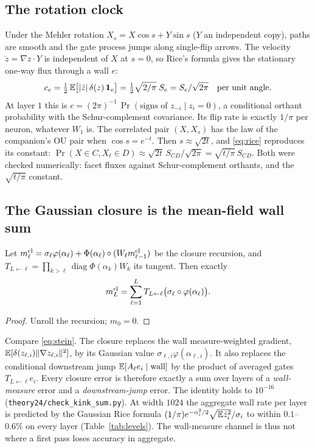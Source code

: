 \subsection{The rotation clock}
Under the Mehler rotation $X_s=X\cos s+Y\sin s$ ($Y$ an independent copy), paths are smooth and the gate process jumps
along single-flip arrows. The velocity $\dot z=\nabla z\cdot Y$ is independent of $X$ at $s=0$, so Rice's formula gives
the stationary one-way flux through a wall $e$:
\begin{equation}\label{eq:rice}
c_e=\tfrac12\,\mathbb{E}\big[|\dot z|\,\delta(z)\,\mathbf 1_e\big]=\tfrac12\sqrt{2/\pi}\;S_e=S_e/\sqrt{2\pi}\quad\text{per unit angle}.
\end{equation}
At layer $1$ this is $c=(2\pi)^{-1}\,\Pr(\text{signs of }z_{-i}\mid z_i=0)$, a conditional orthant probability with the
Schur-complement covariance. Its flip rate is exactly $1/\pi$ per neuron, whatever $W_1$ is. The correlated pair
$(X,X_s)$ has the law of the companion's OU pair when $\cos s=e^{-t}$. Then $s\approx\sqrt{2t}$, and
\eqref{eq:rice} reproduces its constant: $\Pr(X\in C,X_t\in D)\approx\sqrt{2t}\,S_{CD}/\sqrt{2\pi}=\sqrt{t/\pi}\,S_{CD}$.
Both were checked numerically: facet fluxes against Schur-complement orthants, and the $\sqrt{t/\pi}$ constant.

\subsection{The Gaussian closure is the mean-field wall sum}
\begin{proposition}\label{prop:closure}
Let $m^{\rm cl}_\ell=\sigma_\ell\varphi(\alpha_\ell)+\Phi(\alpha_\ell)\circ(W_\ell m^{\rm cl}_{\ell-1})$ be the closure
recursion, and $T_{L\leftarrow\ell}=\prod_{k>\ell}\operatorname{diag}\Phi(\alpha_k)W_k$ its tangent. Then exactly
\[
m^{\rm cl}_L=\sum_{\ell=1}^L T_{L\leftarrow\ell}\big(\sigma_\ell\circ\varphi(\alpha_\ell)\big).
\]
\end{proposition}
\begin{proof}
Unroll the recursion; $m_0=0$.
\end{proof}
Compare \eqref{eq:stein}. The closure replaces the wall measure-weighted gradient,
$\mathbb{E}[\delta(z_{\ell,i})\|\nabla z_{\ell,i}\|^2]$, by its Gaussian value $\sigma_{\ell,i}\varphi(\alpha_{\ell,i})$. It also
replaces the conditional downstream jump $\mathbb{E}[A_\ell e_i\mid\text{wall}]$ by the product of averaged gates
$T_{L\leftarrow\ell}e_i$. Every closure error is therefore exactly a sum over layers of a \emph{wall-measure} error and a
\emph{downstream-jump} error. The identity holds to $10^{-16}$ (\texttt{theory24/check\_kink\_sum.py}). At width $1024$
the aggregate wall rate per layer is predicted by the Gaussian Rice formula
$(1/\pi)e^{-\alpha_i^2/2}\sqrt{\mathbb{E}\dot z_i^2}/\sigma_i$ to within $0.1$--$0.6\%$ on every layer (Table~\ref{tab:levels}).
The wall-measure channel is thus not where a first pass loses accuracy in aggregate.

